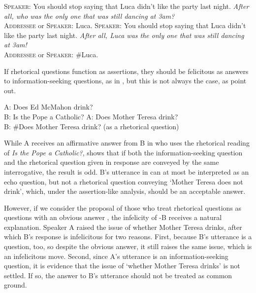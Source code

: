 \documentclass[output=paper,colorlinks,citecolor=brown            ,chinesefont]{langscibook}
\begin{document}
\begin{exe}
\ex\label{answerhood}
\begin{xlist}
\ex\label{answerhood1} \textsc{Speaker:} You should stop saying that Luca didn't like the party last night. \textit{After all,
who was the only one that was still dancing at 3am?}\\
\textsc{Addressee} or \textsc{Speaker:} Luca.
\ex\label{answerhood2} \textsc{Speaker:} You should stop saying that Luca didn't like the party last night. \textit{After all,
Luca was the only one that was still dancing at 3am!}\\
\textsc{Addressee} or \textsc{Speaker:} \#Luca. \hfill \citep[124]{Caponigro+2007}
\end{xlist}
\end{exe}

If rhetorical questions function as assertions, they should be felicitous as answers to information-seeking questions, as in , but this is not always the case, as \citet{Biezma+2017} point out. 

\begin{exe}
\ex\label{answer}
\begin{xlist}
\ex\label{answer1} A: Does Ed McMahon drink?\\
B: Is the Pope a Catholic? \hfill \citep[438]{Schaffer2005}
\ex\label{answer2} A: Does Mother Teresa drink? \\
B: \#Does Mother Teresa drink? (as a rhetorical question)
\end{xlist}
\end{exe}

While A receives an affirmative answer from B in  who uses the rhetorical reading of \textit{Is the Pope a Catholic?},  shows that if both the information-seeking question and the rhetorical question given in response are conveyed by the same interrogative, the result is odd. B's utterance in  can at most be interpreted as an echo question, but not a rhetorical question conveying `Mother Teresa does not drink', which, under the assertion-like analysis, should be an acceptable answer. 

However, if we consider the proposal of those who treat rhetorical questions as questions with an obvious answer \citep{Rohde2006, Caponigro+2007, Biezma+2017}, the infelicity of -B receives a natural explanation. Speaker A raised the issue of whether Mother Teresa drinks, after which B's response is infelicitous for two reasons. First, because B's utterance is a question, too, so despite the obvious answer, it still raises the same issue, which is an infelicitous move. Second, since A's utterance is an information-seeking question, it is evidence that the issue of `whether Mother Teresa drinks' is not settled. If so, the answer to B's utterance should not be treated as common ground.
\end{document}
